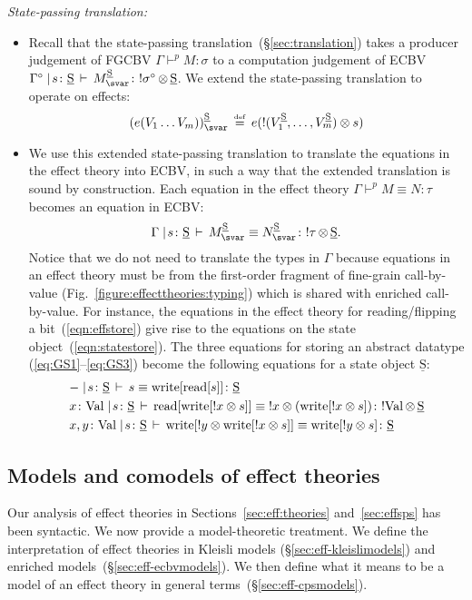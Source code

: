 \documentclass{LMCS}
\newcommand{\pj}[3]{#1 \mathrel{\vdash^p} #2 \colon \! #3}
\newcommand{\peq}[4]{#1 \mathrel{\vdash^p} #2\equiv #3 \colon \! #4}
\newcommand{\val}{\mathrm{Val}}
\newcommand{\EECstate}{\underline{\mathrm{S}}}
\newcommand{\svar}s
\newcommand{\co}{\colon}
\newcommand{\tensor}{\otimes}
\newcommand{\ltensortype}[2]{{!} #1 \, {\tensor} \, #2}
\newcommand{\ltensorterm}[2]{{!  #1} \tensor #2}
\newcommand{\rIn}[2]{#1 \colon  #2}
\newcommand{\aj}[4]{#1 \mid  \! #2 \, \vdash \, \rIn{#3}{#4}}
\newcommand{\aeq}[5]{#1 \mid  \! #2 \, \vdash \, \rIn{#3\equiv #4}{#5}}
\newcommand{\CBVtoEEC}[1]{#1^{\circ}}
\newcommand{\defeq}{\mathrel{\,\stackrel{\mbox{\tiny{$\mathrm{def}$}}}=\,}}
\begin{document}
\emph{State-passing translation:}
\begin{itemize}
\item 
Recall that the state-passing translation~(\S\ref{sec:translation})
takes a producer judgement of FGCBV
$\pj\Gamma M \sigma$ 
to a computation judgement of ECBV
$\aj{\CBVtoEEC\Gamma}{\svar\co\EECstate} {\CBVtoEECP M} {\ltensortype{\CBVtoEEC\sigma}{\EECstate}}$.
We extend the state-passing translation to operate on effects:
\[
\CBVtoEECP{(\geff(V_1\dots V_m))}
\defeq 
\geff(\ltensorterm{(\CBVtoEECV{V_1},\dots,\CBVtoEECV{V_m})}\svar)
\]
\item 
We use this extended state-passing translation to translate
the equations in the effect theory into ECBV,
in such a way that the extended translation is sound by construction.
Each equation in the effect theory
$\peq \Gamma M N \tau$ 
becomes an equation in ECBV:
\[
\aeq \Gamma {s\colon \EECstate}
{\CBVtoEECP{M}}
{\CBVtoEECP{N}}
{\ltensortype\tau\EECstate}\text.
\]
Notice that we do not need to translate the types in $\Gamma$ because
equations in an effect theory must be from the first-order fragment of
fine-grain call-by-value (Fig.~\ref{figure:effecttheories:typing})
which is shared with enriched call-by-value.  For instance, the
equations in the effect theory for reading/flipping a
bit~(\ref{eqn:effstore}) give rise to the equations on the state
object~(\ref{eqn:statestore}).  The three equations for storing an 
abstract datatype (\ref{eq:GS1}--\ref{eq:GS3}) become the following
equations for a state object $\EECstate$:
\[
\begin{aligned}
&\aeq{-}{\svar\co\EECstate}{\svar}{\sassign[\sderef[\svar]]}\EECstate
\\
&\aeq{x\co\val}{\svar\co\EECstate}{\sderef[\sassign[\ltensorterm x\svar]]}
{\ltensorterm x {(\sassign[\ltensorterm x \svar])}}{\ltensortype\val\EECstate}
\\
&\aeq{x,y\co\val}{\svar\co\EECstate}
{\sassign[\ltensorterm y{\sassign [\ltensorterm x  \svar]}]}
{\sassign[\ltensorterm y \svar]}
\EECstate
\end{aligned}
\]
\end{itemize}



\subsection{Models and comodels of effect theories}
\label{sec:effmodels}
Our analysis of effect theories in Sections~\ref{sec:eff:theories}
and~\ref{sec:effsps} has been syntactic.
We now provide a model-theoretic treatment.
We define the interpretation of effect theories in Kleisli models
(\S\ref{sec:eff-kleislimodels})
and enriched models~(\S\ref{sec:eff-ecbvmodels}).
We then 
define what it means to be a model of an effect theory
in general terms~(\S\ref{sec:eff-cpsmodels}).
\end{document}
